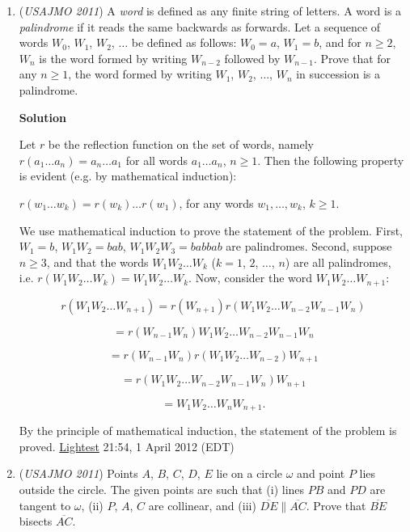 \begin{enumerate}
 


	\item (\textit{USAJMO 2011}) A \textit{word} is defined as any finite string of letters.  A word is a \textit{palindrome} if it reads the same backwards as forwards.  Let a sequence of words $W_0$, $W_1$, $W_2$, $\dots$ be defined as follows: $W_0 = a$, $W_1 = b$, and for $n \ge 2$, $W_n$ is the word formed by writing $W_{n - 2}$ followed by $W_{n - 1}$.  Prove that for any $n \ge 1$, the word formed by writing $W_1$, $W_2$, $\dots$, $W_n$ in succession is a palindrome.


 



\textbf{Solution}

Let $r$ be the reflection function on the set of words, namely $r(a_1\dots a_n) = a_n \dots a_1$ for all words $a_1 \dots a_n$, $n\ge 1$. Then the following property is evident (e.g. by mathematical induction):

 $r(w_1 \dots w_k) = r(w_k) \dots r(w_1)$, for any words $w_1, \dots, w_k$, $k \ge 1$.

 We use mathematical induction to prove the statement of the problem. First, $W_1 = b$, $W_1W_2 = bab$, $W_1W_2W_3 = babbab$  are palindromes. Second, suppose $n\ge 3$, and that the words $W_1 W_2 \dots W_k$  ($k = 1$, $2$, $\dots$, $n$) are all palindromes, i.e. $r(W_1W_2\dots W_k) = W_1W_2\dots W_k$. Now, consider the word $W_1 W_2 \dots W_{n+1}$:

 
 \[r(W_1 W_2 \dots W_{n+1}) = r(W_{n+1}) r(W_1 W_2 \dots W_{n-2}W_{n-1}W_n)\]

 \[= r(W_{n-1}W_n) W_1 W_2 \dots W_{n-2} W_{n-1} W_n\]

 \[= r(W_{n-1}W_n) r(W_1 W_2 \dots W_{n-2}) W_{n+1}\]

 \[= r(W_1 W_2 \dots W_{n-2} W_{n-1}W_n) W_{n+1}\]

 \[= W_1W_2\dots W_n W_{n+1}.\] 

 By the principle of mathematical induction, the statement of the problem is proved. \href{https://artofproblemsolving.com/wiki/index.php?title=User:Lightest}{Lightest} 21:54, 1 April 2012 (EDT)

 


	\item (\textit{USAJMO 2011}) Points $A$, $B$, $C$, $D$, $E$ lie on a circle $\omega$ and point $P$ lies outside the circle.  The given points are such that (i) lines $PB$ and $PD$ are tangent to $\omega$, (ii) $P$, $A$, $C$ are collinear, and (iii) $\overline{DE} \parallel \overline{AC}$.  Prove that $\overline{BE}$ bisects $\overline{AC}$.



\end{enumerate}
